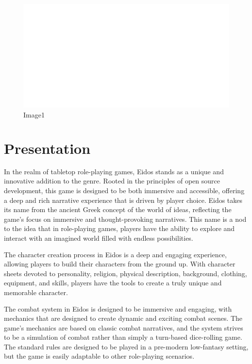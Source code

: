 \begin{figure}
\centering
\includegraphics{./images/index01.svg}
\caption{Image1}
\end{figure}

\hypertarget{presentation}{%
\section{Presentation}\label{presentation}}

In the realm of tabletop role-playing games, Eidos stands as a unique
and innovative addition to the genre. Rooted in the principles of open
source development, this game is designed to be both immersive and
accessible, offering a deep and rich narrative experience that is driven
by player choice. Eidos takes its name from the ancient Greek concept of
the world of ideas, reflecting the game's focus on immersive and
thought-provoking narratives. This name is a nod to the idea that in
role-playing games, players have the ability to explore and interact
with an imagined world filled with endless possibilities.

The character creation process in Eidos is a deep and engaging
experience, allowing players to build their characters from the ground
up. With character sheets devoted to personality, religion, physical
description, background, clothing, equipment, and skills, players have
the tools to create a truly unique and memorable character.

The combat system in Eidos is designed to be immersive and engaging,
with mechanics that are designed to create dynamic and exciting combat
scenes. The game's mechanics are based on classic combat narratives, and
the system strives to be a simulation of combat rather than simply a
turn-based dice-rolling game. The standard rules are designed to be
played in a pre-modern low-fantasy setting, but the game is easily
adaptable to other role-playing scenarios.

